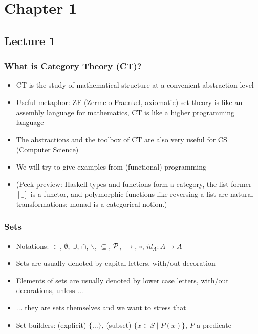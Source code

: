 \documentclass[handout]{beamer}
\title[INF223 presentations]{}
\begin{document}
\section{Chapter 1}
\subsection{Lecture 1}
 
\frame
  {   
    \frametitle{What is Category Theory (CT)?}\label{Ch1:What is CT}

 \begin{itemize}[<+->]
\item CT is the study of mathematical structure at a convenient abstraction level
\item Useful metaphor: ZF (Zermelo-Fraenkel, axiomatic) set theory is like an assembly language for mathematics, CT is like a higher programming language
\item The abstractions and the toolbox of CT are also very useful for CS (Computer Science)
\item We will try to give examples from (functional) programming
\item (Peek preview: Haskell types and functions form a category, 
the list former $[\_]$ is a functor, and polymorphic functions like reversing  a list are
natural transformations; monad is a categorical notion.)
 
 \end{itemize}

 }

\frame
  {   
    \frametitle{Sets}\label{Ch1:sets}

 \begin{itemize}[<+->]
\item Notations: $\in$, $\emptyset$, $\cup$, $\cap$, $\backslash$, 
$\subseteq$, $\operatorname{\mathcal{P}}$, $\to$, $\circ$, $id_A : A\to A$
\item Sets are usually denoted by capital letters, with/out decoration
\item Elements of sets are usually denoted by lower case letters, with/out decorations, unless ...
\item ...  they are sets themselves and we want to stress that
\item Set builders: (explicit) $\{ \ldots \}$,  (subset) $\{x \in S \mid P(x) \}$, $P$ a predicate
 \end{itemize}

 }
\end{document}
